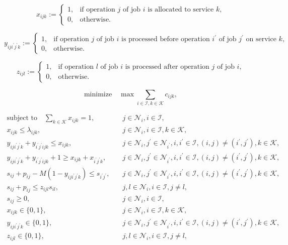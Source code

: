 \documentclass[UTF8]{ctexart}
\begin{document}
\begin{equation}
x_{ijk} := 
\begin{cases}
1, & \text{if operation $j$ of job $i$ is allocated to service $k$}, \\
0, & \text{otherwise}.
\end{cases}
\end{equation}

\begin{equation}
y_{iji^{'}j^{'}k} := 
\begin{cases}
1, & \text{if operation $j$ of job $i$ is processed before operation $i^{'}$ of job $j^{'}$ on service $k$}, \\
0, & \text{otherwise}.
\end{cases}
\end{equation}

\begin{equation}
z_{ijl} := 
\begin{cases}
1, & \text{if operation $l$ of job $i$ is processed after operation $j$ of job $i$}, \\
0, & \text{otherwise}.
\end{cases}
\end{equation}

\begin{equation}
\text{minimize} \quad \max \sum_{i \in \mathcal{I}, k \in \mathcal{K}} c_{ijk},
\end{equation}

\begin{align}
\text{subject to} \quad \sum_{k \in \mathcal{K}} x_{ijk} = 1, &\quad j \in \mathcal{N}_i, i \in \mathcal{I}, \\
x_{ijk} \leqslant \lambda_{ijk}, &\quad j \in \mathcal{N}_i, i \in \mathcal{I}, k \in \mathcal{K},\\
y_{iji^{'}j^{'}k} + y_{i^{'}j^{'}ijk} \leqslant x_{ijk}, &\quad j \in \mathcal{N}_i, j^{'} \in \mathcal{N}_{i^{'}}, i, i^{'} \in \mathcal{I},  (i, j) \ne (i^{'}, j^{'}), k \in \mathcal{K},\\
y_{iji^{'}j^{'}k} + y_{i^{'}j^{'}ijk} + 1 \geqslant x_{ijk} + x_{i^{'}j^{'}k}, &\quad j \in \mathcal{N}_i, j^{'} \in \mathcal{N}_{i^{'}}, i, i^{'} \in \mathcal{I},  (i, j) \ne (i^{'}, j^{'}), k \in \mathcal{K},\\
s_{ij} + p_{ij} - M(1 - y_{iji^{'}j^{'}k}) \leqslant s_{i^{'}j^{'}}, &\quad j \in \mathcal{N}_i, j^{'} \in \mathcal{N}_{i^{'}}, i, i^{'} \in \mathcal{I},  (i, j) \ne (i^{'}, j^{'}), k \in \mathcal{K},\\
s_{ij} + p_{ij} \leqslant z_{ijl}s_{il}, &\quad j, l \in \mathcal{N}_i, i \in \mathcal{I}, j \ne l, \\
s_{ij} \geqslant 0, &\quad j \in \mathcal{N}_i, i \in \mathcal{I}, \\
x_{ijk} \in \{0, 1\}, &\quad j \in \mathcal{N}_i, i \in \mathcal{I}, k \in \mathcal{K}, \\
y_{iji^{'}j^{'}k} \in \{0, 1\}, &\quad j \in \mathcal{N}_i, j^{'} \in \mathcal{N}_{i^{'}}, i, i^{'} \in \mathcal{I},  (i, j) \ne (i^{'}, j^{'}), k \in \mathcal{K},\\
z_{ijl} \in \{0, 1\}, &\quad j, l \in \mathcal{N}_i, i \in \mathcal{I}, j \ne l,
\end{align}
\end{document}
